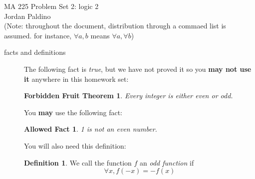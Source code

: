 \documentclass{letter}
\newtheorem*{theorem*}{Forbidden Fruit Theorem}
\newtheorem*{allowed}{Allowed Fact}
\theoremstyle{definition}
\newtheorem*{definition}{Definition}
\begin{document}
\pagestyle{empty}

{\Large MA 225 Problem Set 2: logic 2}\\
Jordan Paldino \\
(Note: throughout the document, distribution through a commaed list is assumed. for instance, $\forall a,b$ means $\forall a, \forall b$)
\begin{description}
\item[facts and definitions] The following fact is {\em true}, but we have not proved it so you {\bfseries may not use it} anywhere in this homework set:
\begin{theorem*}
	Every integer is either even or odd.
\end{theorem*}

You {\bfseries may} use the following fact:
\begin{allowed}
	1 is not an even number.
\end{allowed}

You will also need this definition:
\begin{definition}
	We call the function $f$ an {\em odd function} if $$\forall x, f(-x)=-f(x)$$  
	

\end{definition}
\end{description}
\end{document}
